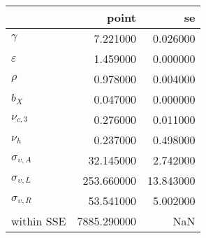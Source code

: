 \begin{tabular}{lrr}
\toprule
 & point & se \\
\midrule
$\gamma$ & 7.221000 & 0.026000 \\
$\varepsilon$ & 1.459000 & 0.000000 \\
$\rho$ & 0.978000 & 0.004000 \\
$b_X$ & 0.047000 & 0.000000 \\
$\nu_{c,3}$ & 0.276000 & 0.011000 \\
$\nu_{h}$ & 0.237000 & 0.498000 \\
$\sigma_{\upsilon,A}$ & 32.145000 & 2.742000 \\
$\sigma_{\upsilon,L}$ & 253.660000 & 13.843000 \\
$\sigma_{\upsilon,R}$ & 53.541000 & 5.002000 \\
within SSE & 7885.290000 & NaN \\
\bottomrule
\end{tabular}
